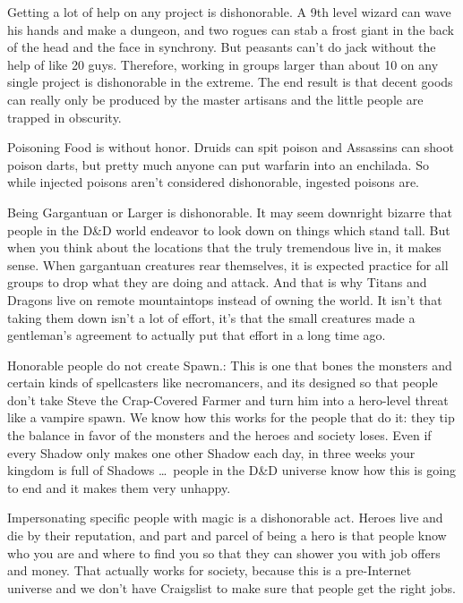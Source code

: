 \listone
    \item Getting a lot of help on any project is dishonorable. A 9th level wizard can wave his hands and make a dungeon, and two rogues can stab a frost giant in the back of the head and the face in synchrony. But peasants can't do jack without the help of like 20 guys. Therefore, working in groups larger than about 10 on any single project is dishonorable in the extreme. The end result is that decent goods can really only be produced by the master artisans and the little people are trapped in obscurity.
    \item Poisoning Food is without honor. Druids can spit poison and Assassins can shoot poison darts, but pretty much anyone can put warfarin into an enchilada. So while injected poisons aren't considered dishonorable, ingested poisons are.
    \item Being Gargantuan or Larger is dishonorable. It may seem downright bizarre that people in the D\&D world endeavor to look down on things which stand tall. But when you think about the locations that the truly tremendous live in, it makes sense. When gargantuan creatures rear themselves, it is expected practice for all groups to drop what they are doing and attack. And that is why Titans and Dragons live on remote mountaintops instead of owning the world. It isn't that taking them down isn't a lot of effort, it's that the small creatures made a gentleman's agreement to actually put that effort in a long time ago.
    \item Honorable people do not create Spawn.: This is one that bones the monsters and certain kinds of spellcasters like necromancers, and its designed so that people don't take Steve the Crap-Covered Farmer and turn him into a hero-level threat like a vampire spawn. We know how this works for the people that do it: they tip the balance in favor of the monsters and the heroes and society loses. Even if every Shadow only makes one other Shadow each day, in three weeks your kingdom is full of Shadows \ldots\ people in the D\&D universe know how this is going to end and it makes them very unhappy.
    \item Impersonating specific people with magic is a dishonorable act. Heroes live and die by their reputation, and part and parcel of being a hero is that people know who you are and where to find you so that they can shower you with job offers and money. That actually works for society, because this is a pre-Internet universe and we don't have Craigslist to make sure that people get the right jobs.
